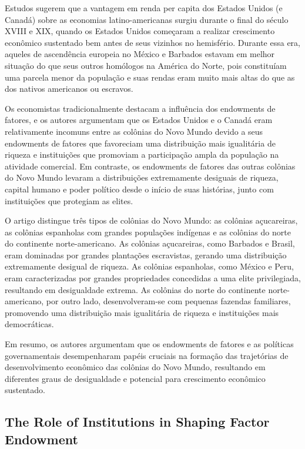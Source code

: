\documentclass[a4paper,12pt]{article}[abntex2]
\begin{document}
Estudos sugerem que a vantagem em renda per capita dos Estados Unidos (e Canadá) sobre as economias latino-americanas surgiu durante o final do século XVIII e XIX, quando os Estados Unidos começaram a realizar crescimento econômico sustentado bem antes de seus vizinhos no hemisfério. Durante essa era, aqueles de ascendência europeia no México e Barbados estavam em melhor situação do que seus outros homólogos na América do Norte, pois constituíam uma parcela menor da população e suas rendas eram muito mais altas do que as dos nativos americanos ou escravos.

Os economistas tradicionalmente destacam a influência dos endowments de fatores, e os autores argumentam que os Estados Unidos e o Canadá eram relativamente incomuns entre as colônias do Novo Mundo devido a seus endowments de fatores que favoreciam uma distribuição mais igualitária de riqueza e instituições que promoviam a participação ampla da população na atividade comercial. Em contraste, os endowments de fatores das outras colônias do Novo Mundo levaram a distribuições extremamente desiguais de riqueza, capital humano e poder político desde o início de suas histórias, junto com instituições que protegiam as elites.

O artigo distingue três tipos de colônias do Novo Mundo: as colônias açucareiras, as colônias espanholas com grandes populações indígenas e as colônias do norte do continente norte-americano. As colônias açucareiras, como Barbados e Brasil, eram dominadas por grandes plantações escravistas, gerando uma distribuição extremamente desigual de riqueza. As colônias espanholas, como México e Peru, eram caracterizadas por grandes propriedades concedidas a uma elite privilegiada, resultando em desigualdade extrema. As colônias do norte do continente norte-americano, por outro lado, desenvolveram-se com pequenas fazendas familiares, promovendo uma distribuição mais igualitária de riqueza e instituições mais democráticas.

Em resumo, os autores argumentam que os endowments de fatores e as políticas governamentais desempenharam papéis cruciais na formação das trajetórias de desenvolvimento econômico das colônias do Novo Mundo, resultando em diferentes graus de desigualdade e potencial para crescimento econômico sustentado.

\subsection*{\textbf{The Role of Institutions in Shaping Factor Endowment}}
\end{document}
